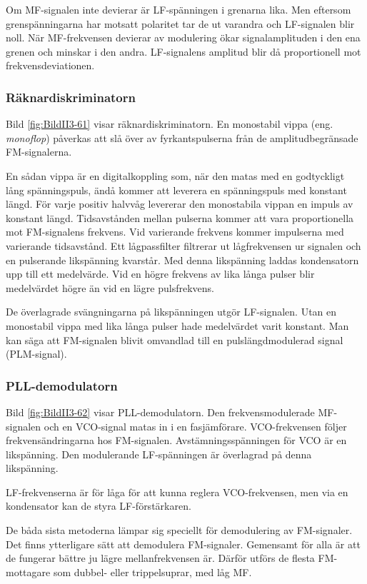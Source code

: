 Om MF-signalen inte devierar är LF-spänningen i grenarna lika. Men
eftersom grenspänningarna har motsatt polaritet tar de ut varandra
och LF-signalen blir noll.
När MF-frekvensen devierar av modulering ökar signalamplituden i den ena
grenen och minskar i den andra.
LF-signalens amplitud blir då proportionell mot frekvensdeviationen.

\subsubsection{Räknardiskriminatorn}


Bild \ref{fig:BildII3-61} visar räknardiskriminatorn.
En monostabil vippa (eng. \emph{monoflop}) påverkas att slå över av fyrkantspulserna från de
amplitudbegränsade FM-signalerna.

En sådan vippa är en digitalkoppling som, när den matas med en godtyckligt lång
spänningspuls, ändå kommer att leverera en spänningspuls med konstant längd.
För varje positiv halvvåg levererar den monostabila vippan en impuls av konstant längd.
Tidsavstånden mellan pulserna kommer att vara proportionella mot FM-signalens frekvens.
Vid varierande frekvens kommer impulserna med varierande tidsavstånd.
Ett lågpassfilter filtrerar ut lågfrekvensen ur signalen och en pulserande
likspänning kvarstår.
Med denna likspänning laddas kondensatorn upp till ett medelvärde.
Vid en högre frekvens av lika långa pulser blir medelvärdet högre än vid en
lägre pulsfrekvens.

De överlagrade svängningarna på likspänningen utgör LF-signalen.
Utan en monostabil vippa med lika långa pulser hade medelvärdet varit konstant.
Man kan säga att FM-signalen blivit omvandlad till en pulslängdmodulerad signal
(PLM-signal).

\subsubsection{PLL-demodulatorn}


Bild \ref{fig:BildII3-62} visar PLL-demodulatorn.
Den frekvensmodulerade MF-signalen och en VCO-signal matas in i en
fasjämförare.
VCO-frekvensen följer frekvensändringarna hos FM-signalen.
Avstämningsspänningen för VCO är en likspänning.
Den modulerande LF-spänningen är överlagrad på denna likspänning.

LF-frekvenserna är för låga för att kunna reglera VCO-frekvensen, men
via en kondensator kan de styra LF-förstärkaren.

De båda sista metoderna lämpar sig speciellt för demodulering av FM-signaler.
Det finns ytterligare sätt att demodulera FM-signaler.
Gemensamt för alla är att de fungerar bättre ju lägre mellanfrekvensen är.
Därför utförs de flesta FM-mottagare som dubbel- eller trippelsuprar, med låg
MF.
